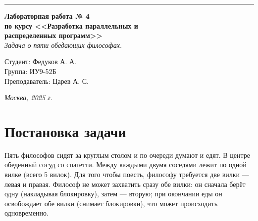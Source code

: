 \documentclass[a4paper, 14pt]{extarticle}
\begin{document}
\begin{titlepage}
\vspace*{-16pt}
\hspace{30pt}\rule{0.866\textwidth}{0.4pt}
  
\vspace{11em}

\begin{center}
\Large {\bf Лабораторная работа № 4} \\ 
\large {\bf по курсу <<Разработка параллельных и \\ распределенных программ>>} \\
\textit{Задача о пяти обедающих философах.}

\end{center}\normalsize

\vspace{8em}


\begin{flushright}
 \begin{minipage}{0.5\linewidth}
      {Студент: Федуков А. А. \hspace*{15pt}\\ 
      Группа: ИУ9-52Б \\ 
      Преподаватель: Царев А. С. \hspace*{15pt}}
  \end{minipage}
\end{flushright}
\bigskip
\vfill
\begin{center}
\textsl{Москва, 2025 г.}
\end{center}
\end{titlepage}

\renewcommand{\ttdefault}{pcr}

\setlength{\tabcolsep}{3pt}
\newpage
\setcounter{page}{2}

{
  \hypersetup{linkcolor=black}
  \tableofcontents
}


\section*{Постановка задачи}\label{Sect::goal}
Пять философов сидят за круглым столом и по очереди думают и едят. В центре обеденный сосуд со спагетти. Между каждыми двумя соседями лежит по одной вилке (всего 5 вилок). Для того чтобы поесть, философу требуется две вилки — левая и правая. Философ не может захватить сразу обе вилки: он сначала берёт одну (накладывая блокировку), затем — вторую; при окончании еды он освобождает обе вилки (снимает блокировки), что может происходить одновременно.
\end{document}
